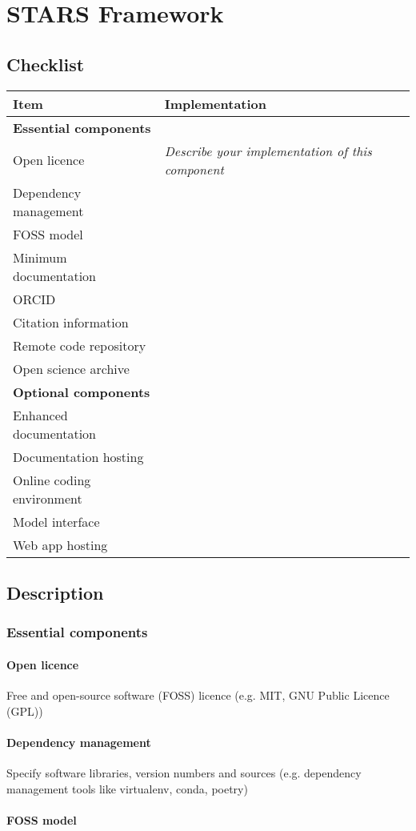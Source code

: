 \documentclass[
]{article}
\author{}
\date{}
\begin{document}
\section{STARS Framework}

\subsection{Checklist}

\begin{longtable}[]{@{}ll@{}}
\toprule
Item & Implementation\tabularnewline
\midrule
\endhead
\textbf{Essential components} &\tabularnewline
Open licence & \emph{Describe your implementation of this
component}\tabularnewline
Dependency management &\tabularnewline
FOSS model &\tabularnewline
Minimum documentation &\tabularnewline
ORCID &\tabularnewline
Citation information &\tabularnewline
Remote code repository &\tabularnewline
Open science archive &\tabularnewline
\textbf{Optional components} &\tabularnewline
Enhanced documentation &\tabularnewline
Documentation hosting &\tabularnewline
Online coding environment &\tabularnewline
Model interface &\tabularnewline
Web app hosting &\tabularnewline
\bottomrule
\end{longtable}

\subsection{Description}

\subsubsection{Essential components}

\paragraph{Open licence}

Free and open-source software (FOSS) licence (e.g. MIT, GNU Public
Licence (GPL))

\paragraph{Dependency management}

Specify software libraries, version numbers and sources (e.g. dependency
management tools like virtualenv, conda, poetry)

\paragraph{FOSS model}
\end{document}
